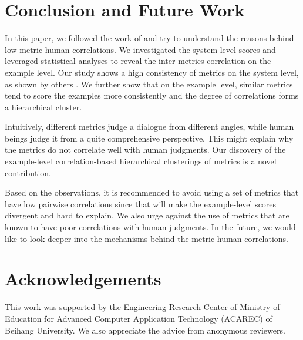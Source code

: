\documentclass[conference]{IEEEtran}
\begin{document}
\section{Conclusion and Future Work}
In this paper, we followed the work of \cite{HowNot} and try to understand the reasons behind low metric-human correlations. We investigated the system-level scores and leveraged statistical analyses to reveal the inter-metrics correlation on the example level. Our study shows a high consistency of metrics on the system level, as shown by others \cite{HowNot,VHRED,GoogleChatbot}. We further show that on the example level, similar metrics tend to score the examples more consistently and the degree of correlations forms a hierarchical cluster.

Intuitively, different metrics judge a dialogue from different angles, while human beings judge it from a quite comprehensive perspective. This might explain why the metrics do not correlate well with human judgments. Our discovery of the example-level correlation-based hierarchical clusterings of metrics is a novel contribution.

Based on the observations, it is recommended to avoid using a set of metrics that have low pairwise correlations since that will make the example-level scores divergent and hard to explain. We also urge against the use of metrics that are known to have poor correlations with human judgments. In the future, we would like to look deeper into the mechanisms behind the metric-human correlations.

\section*{Acknowledgements}
This work was supported by the Engineering Research Center of Ministry of Education for Advanced Computer Application Technology (ACAREC) of Beihang University. We also appreciate the advice from anonymous reviewers.



%
%
%



\end{document}
